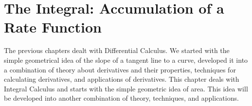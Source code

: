 \chapter{The Integral: Accumulation of a Rate Function}
\label{ch:integrals}

The previous chapters dealt with Differential Calculus. We started with the simple geometrical idea of the slope of a tangent line to a curve, developed it into a combination of theory about derivatives and their properties, techniques for calculating derivatives, and applications of derivatives. This chapter deals with Integral Calculus and starts with the simple geometric idea of area. This idea will be developed into another combination of theory, techniques, and applications.

%
%
%
%
%
%
%
%
%
%
